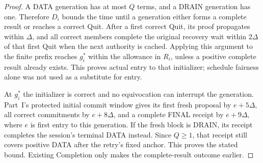 \begin{proof}
A DATA generation has at most $Q$ terms, and a DRAIN generation has
one. Therefore $D_i$ bounds the time until a generation either forms a
complete result or reaches a correct Quit. After a first correct Quit,
its proof propagates within $\Delta$, and all correct members complete
the original recovery wait within $2\Delta$ of that first Quit when
the next authority is cached. Applying this argument to the finite
prefix reaches $g_i^*$ within the allowance in $R_i$, unless a positive
complete result already exists. This proves actual entry to that
initializer; schedule fairness alone was not used as a substitute for
entry.

At $g_i^*$ the initializer is correct and no equivocation can interrupt
the generation. Part~I's protected initial commit window gives its
first fresh proposal by $e+5\Delta$, all correct commitments by
$e+8\Delta$, and a complete FINAL receipt by $e+9\Delta$, where $e$
is first entry to this generation. If the fresh block is DRAIN, its
receipt completes the session's terminal DATA instead. Since $Q\ge1$,
that receipt still covers positive DATA after the retry's fixed anchor.
This proves the stated bound. Existing Completion only makes the
complete-result outcome earlier.
\end{proof}

